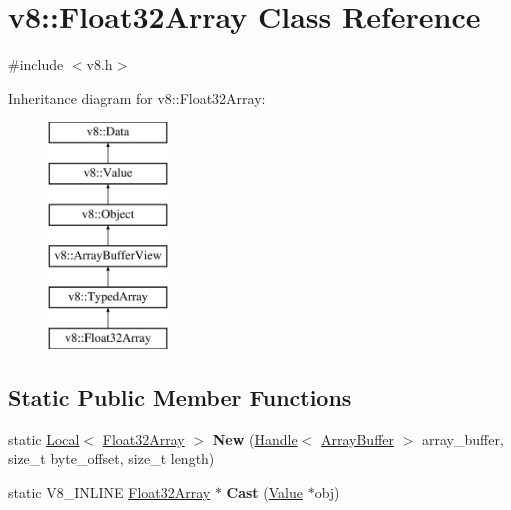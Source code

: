 \hypertarget{classv8_1_1_float32_array}{}\section{v8\+:\+:Float32\+Array Class Reference}
\label{classv8_1_1_float32_array}


{\ttfamily \#include $<$v8.\+h$>$}

Inheritance diagram for v8\+:\+:Float32\+Array\+:\begin{figure}[H]
\begin{center}
\leavevmode
\includegraphics[height=6.000000cm]{classv8_1_1_float32_array}
\end{center}
\end{figure}
\subsection*{Static Public Member Functions}
\begin{DoxyCompactItemize}
\item 
\hypertarget{classv8_1_1_float32_array_a6fea1d1987ec9abce97060900d5fc4af}{}static \hyperlink{classv8_1_1_local}{Local}$<$ \hyperlink{classv8_1_1_float32_array}{Float32\+Array} $>$ {\bfseries New} (\hyperlink{classv8_1_1_handle}{Handle}$<$ \hyperlink{classv8_1_1_array_buffer}{Array\+Buffer} $>$ array\+\_\+buffer, size\+\_\+t byte\+\_\+offset, size\+\_\+t length)\label{classv8_1_1_float32_array_a6fea1d1987ec9abce97060900d5fc4af}

\item 
\hypertarget{classv8_1_1_float32_array_adf926d03cacd4b3901d7f9750671a350}{}static V8\+\_\+\+I\+N\+L\+I\+N\+E \hyperlink{classv8_1_1_float32_array}{Float32\+Array} $\ast$ {\bfseries Cast} (\hyperlink{classv8_1_1_value}{Value} $\ast$obj)\label{classv8_1_1_float32_array_adf926d03cacd4b3901d7f9750671a350}

\end{DoxyCompactItemize}
